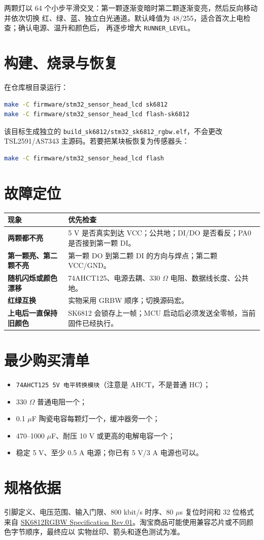 \documentclass[UTF8,11pt]{ctexart}
\begin{document}
两颗灯以 64 个小步平滑交叉：第一颗逐渐变暗时第二颗逐渐变亮，然后反向移动并依次切换
红、绿、蓝、独立白光通道。默认峰值为 48/255，适合首次上电检查；确认电源、温升和颜色后，
再逐步增大 \texttt{RUNNER\_LEVEL}。

\section{构建、烧录与恢复}

在仓库根目录运行：
\begin{lstlisting}[language=bash]
make -C firmware/stm32_sensor_head_lcd sk6812
make -C firmware/stm32_sensor_head_lcd flash-sk6812
\end{lstlisting}

该目标生成独立的 \texttt{build\_sk6812/stm32\_sk6812\_rgbw.elf}，不会更改
TSL2591/AS7343 主源码。若要把某块板恢复为传感器头：
\begin{lstlisting}[language=bash]
make -C firmware/stm32_sensor_head_lcd flash
\end{lstlisting}

\section{故障定位}

\begin{tabularx}{\textwidth}{>{\bfseries}p{}X}
\toprule
现象 & 优先检查 \\
\midrule
两颗都不亮 & 5 V 是否真实到达 VCC；公共地；DI/DO 是否看反；PA0 是否接到第一颗 DI。\\
第一颗亮、第二颗不亮 & 第一颗 DO 到第二颗 DI 的方向与焊点；第二颗 VCC/GND。\\
随机闪烁或颜色漂移 & 74AHCT125、电源去耦、330 $\Omega$ 电阻、数据线长度、公共地。\\
红绿互换 & 实物采用 GRBW 顺序；切换源码宏。\\
上电后一直保持旧颜色 & SK6812 会锁存上一帧；MCU 启动后必须发送全零帧，当前固件已经执行。\\
\bottomrule
\end{tabularx}

\section{最少购买清单}

\begin{itemize}
  \item \texttt{74AHCT125 5V 电平转换模块}（注意是 AHCT，不是普通 HC）；
  \item 330 $\Omega$ 普通电阻一个；
  \item 0.1 $\mu$F 陶瓷电容每颗灯一个，缓冲器旁一个；
  \item 470--1000 $\mu$F、耐压 10 V 或更高的电解电容一个；
  \item 稳定 5 V、至少 0.5 A 电源；你已有 5 V/3 A 电源也可以。
\end{itemize}

\section*{规格依据}

引脚定义、电压范围、输入门限、800 kbit/s 时序、80 $\mu$s 复位时间和 32 位格式来自
\href{https://cdn-shop.adafruit.com/product-files/2757/p2757_SK6812RGBW_REV01.pdf}
{SK6812RGBW Specification Rev.01}。淘宝商品可能使用兼容芯片或不同颜色字节顺序，最终应以
实物丝印、箭头和逐色测试为准。
\end{document}
